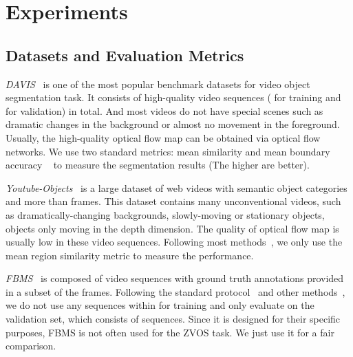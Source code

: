 \documentclass[sigconf]{acmart}
\begin{document}
\section{Experiments}
\subsection{Datasets and Evaluation Metrics}


\emph{DAVIS}~\cite{davis16} is one of the most popular benchmark datasets for video object segmentation task. It consists of  high-quality video sequences ( for training and  for validation) in total. And most videos do not have special scenes such as dramatic changes in the background or almost no movement in the foreground. Usually, the high-quality optical flow map can be obtained via optical flow networks. We use two standard metrics: mean similarity  and mean boundary accuracy ~\cite{davis16} to measure the segmentation results (The higher are better). 

\emph{Youtube-Objects}~\cite{youtube-objects} is a large dataset of  web videos with  semantic object categories and more than  frames. This dataset contains many unconventional videos, such as dramatically-changing backgrounds, slowly-moving or stationary objects, objects only moving in the depth dimension. The quality of optical flow map is usually low in these video sequences. Following most methods~\cite{MATNet,WCS,AGNN,COSNet,AGS,PDB}, we only use the mean region similarity  metric to measure the performance. 

\emph{FBMS}~\cite{FBMS} is composed of  video sequences with ground truth annotations provided in a subset of the frames. Following the standard protocol~\cite{LVO} and other methods~\cite{MATNet,PDB}, we do not use any sequences within for training and only evaluate on the validation set, which consists of  sequences. Since it is designed for their specific purposes, FBMS is not often used for the ZVOS task. We just use it for a fair comparison.
\end{document}
